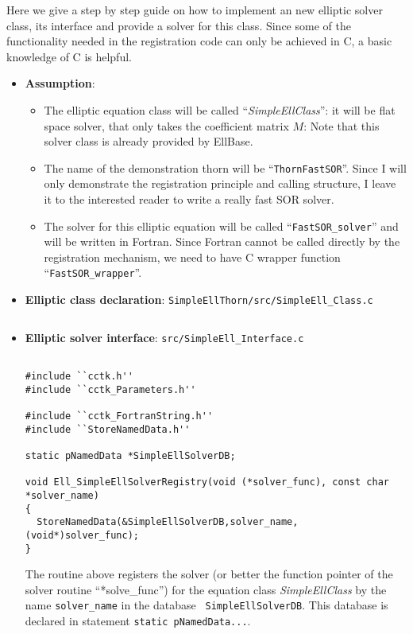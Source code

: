 \documentclass{article}
\begin{document}
Here we give a step by step guide on how to implement an new elliptic 
solver class, its interface and provide a solver for this class.  Since 
some of the functionality needed in the registration code can only be 
achieved in C, a basic knowledge of C is helpful.

\begin{itemize}
\item{\bf Assumption}:
\begin{itemize} 
\item{}The elliptic equation 
class will be called ``{\em SimpleEllClass}'': it will be flat space solver, 
that only 
takes the coefficient matrix $M$: 
Note that this solver class is already provided by EllBase.
\item{}The name of the demonstration thorn will be 
``{\tt ThornFastSOR}''. Since I will only demonstrate the registration principle 
and calling structure, I leave it to the interested reader to write a really 
fast SOR solver.
\item{}The solver for this elliptic equation will be called ``{\tt FastSOR\_solver}''
and will be written in Fortran. Since Fortran cannot be called
directly by the registration mechanism, we
need to have C wrapper function ``{\tt FastSOR\_wrapper}''. 
\end{itemize}

\item{\bf Elliptic class declaration}: {\tt SimpleEllThorn/src/SimpleEll\_Class.c} 
\begin{verbatim}
\end{verbatim}

\item{\bf Elliptic solver interface}: {\tt src/SimpleEll\_Interface.c}
\begin{verbatim}

#include ``cctk.h''
#include ``cctk_Parameters.h''

#include ``cctk_FortranString.h'' 
#include ``StoreNamedData.h''

static pNamedData *SimpleEllSolverDB;

void Ell_SimpleEllSolverRegistry(void (*solver_func), const char *solver_name)
{
  StoreNamedData(&SimpleEllSolverDB,solver_name,(void*)solver_func);
}
\end{verbatim}
The routine above registers the solver (or better the function pointer of the solver routine ``*solve\_func'') for the equation class 
{\em SimpleEllClass} by the name {\tt solver\_name} in the database {\tt
SimpleEllSolverDB}. This database is declared in statement {\tt static pNamedData...}.



\end{itemize}
\end{document}
